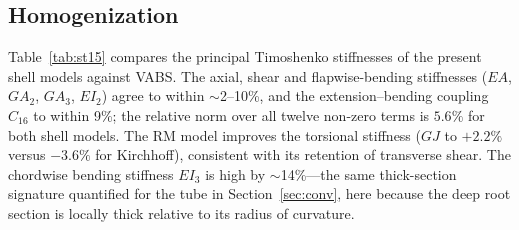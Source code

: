 \documentclass[preprint,12pt]{elsarticle}
\begin{document}
\subsection{Homogenization}
Table~\ref{tab:st15} compares the principal Timoshenko stiffnesses of the
present shell models against VABS. The axial, shear and flapwise-bending
stiffnesses ($EA$, $GA_2$, $GA_3$, $EI_2$) agree to within $\sim$2--10\%, and
the extension--bending coupling $C_{16}$ to within 9\%; the relative norm over
all twelve non-zero terms is $5.6\%$ for both shell models. The RM model
improves the torsional stiffness ($GJ$ to $+2.2\%$ versus $-3.6\%$ for
Kirchhoff), consistent with its retention of transverse shear. The chordwise
bending stiffness $EI_3$ is high by $\sim$14\%---the same thick-section
signature quantified for the tube in Section~\ref{sec:conv}, here because the
deep root section is locally thick relative to its radius of curvature.

\begin{table}[t]\centering
\caption{Station-15 principal Timoshenko stiffnesses: present shell models
versus VABS (2D solid FE). The relative norm over all twelve non-zero
$6\times6$ terms is $5.6\%$ for both models.}
\label{tab:st15}
\end{table}
\end{document}
